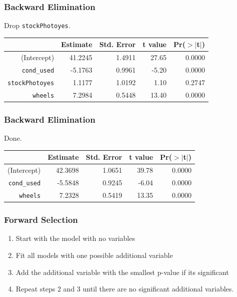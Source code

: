 \documentclass[handout]{beamer}
\newcommand{\blue}[1]{\textcolor{blue2}{#1}}
\begin{document}
\begin{frame}[fragile]
\frametitle{Backward Elimination}
Drop {\tt stockPhotoyes}.

\begin{table}[ht]
\centering
\begin{tabular}{rrrrr}
  \hline
 & Estimate & Std. Error & t value & Pr($>$$|$t$|$) \\ 
  \hline
(Intercept) & 41.2245 & 1.4911 & 27.65 & 0.0000 \\ 
  {\tt cond\_used} & -5.1763 & 0.9961 & -5.20 & 0.0000 \\ 
  \blue{{\tt stockPhotoyes}} & \blue{1.1177} & \blue{1.0192} & \blue{1.10} & \blue{0.2747} \\ 
  {\tt wheels} & 7.2984 & 0.5448 & 13.40 & 0.0000 \\ 
   \hline
\end{tabular}
\end{table}

\end{frame}


\begin{frame}[fragile]
\frametitle{Backward Elimination}
Done.

\begin{table}[ht]
\centering
\begin{tabular}{rrrrr}
  \hline
 & Estimate & Std. Error & t value & Pr($>$$|$t$|$) \\ 
  \hline
(Intercept) & 42.3698 & 1.0651 & 39.78 & 0.0000 \\ 
  {\tt cond\_used} & -5.5848 & 0.9245 & -6.04 & 0.0000 \\ 
  {\tt wheels} & 7.2328 & 0.5419 & 13.35 & 0.0000 \\ 
   \hline
\end{tabular}
\end{table}
 

\end{frame}


\begin{frame}[fragile]
\frametitle{Forward Selection}

\begin{enumerate}
\item Start with the model with no variables
\pause\item Fit all models with one possible additional variable
\pause\item Add the additional variable with the smallest p-value if its significant
\pause\item Repeat steps 2 and 3 until there are no significant additional variables.  
\end{enumerate}

\end{frame}
\end{document}
